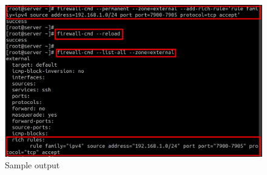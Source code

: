 \begin{flushleft}
\begin{itemize}
\begin{enumerate}
		\begin{figure}[h!]
			\centering
			\includegraphics[scale=.3]{content/chapter2/images/zones12.png}
			\caption{Sample output}
			\label{fig:command_prompt10}
		\end{figure}
		
	\end{enumerate}
	
\end{itemize}

	
\end{flushleft}

\newpage





